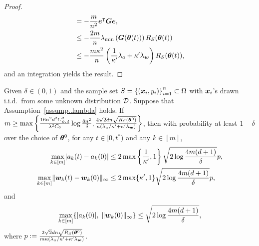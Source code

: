 \documentclass{article}
\begin{document}
\begin{proof}
\begin{equation*}
\begin{aligned}
             & =-\frac{m}{n^2}\bm{e}^{\intercal}\bm{G}\bm{e},                                                                                                                                                  \\
             & \leq -\frac{2m}{n}\lambda_{\min}\left(\bm{G}(\bm{\theta}(t))\right)R_S(\bm{\theta}(t))                                                                                                     \\
             & \leq -\frac{m\kappa^2}{n}\left(\frac{1}{\kappa'}\lambda_a+\kappa'\lambda_{\bm{w}}\right)R_S(\bm{\theta}(t)),
        \end{aligned}
    \end{equation*}
    and an integration yields the result.
\end{proof}

\begin{prop}\label{prop:a_w}
    Given $\delta\in(0,1)$ and the sample set $S = {\{(\bm{x}_i, y_i)\}}_{i=1}^n\subset\Omega$ with $\bm{x}_i$'s drawn i.i.d.\ from some unknown distribution $\mathcal{D}$. Suppose that Assumption~\ref{assump..lambda} holds. If $m\geq\max\left\{\frac{16n^2d^2C_{\psi,d}^2}{\lambda^2C_0}\log\frac{8n^2}{\delta}, \frac{4\sqrt{2d}n\sqrt{R_S(\bm{\theta}^0)}}{\kappa\left(\lambda_a/\kappa'+\kappa'\lambda_{\bm{w}}\right)}\right\}$, then with probability at least $1-\delta$ over the choice of $\bm{\theta}^0$, for any $t\in[0, t^\ast)$ and any $k\in [m]$,
    \begin{align}
        \max\limits_{k\in[m]}\lvert a_k(t) - a_k(0)\rvert
         & \leq 2\max\left\{\frac{1}{\kappa'},1\right\}\sqrt{2\log\frac{4m(d+1)}{\delta}}p, \\
        \max\limits_{k\in[m]}\lVert\bm{w}_k(t) - \bm{w}_k(0)\rVert_{\infty}
         & \leq 2\max\{
        \kappa',1\}\sqrt{2\log\frac{4m(d+1)}{\delta}}p,
    \end{align}
    and
    \begin{equation}
        \max\limits_{k\in[m]}\{\lvert a_k(0)\rvert,\;\lVert\bm{w}_k(0)\rVert_{\infty}\} \leq \sqrt{2\log\frac{4m(d+1)}{\delta}},
    \end{equation}
    where $p := \frac{2\sqrt{2}dn\sqrt{R_S(\bm{\theta}^0)}}{m\kappa\left(\lambda_a/\kappa'+\kappa'\lambda_{\bm{w}}\right)}$.
\end{prop}
\end{document}
